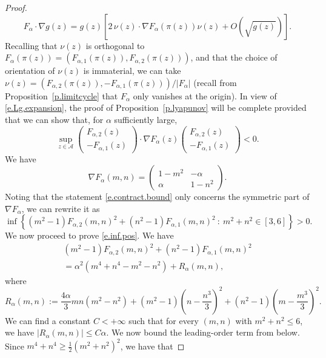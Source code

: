 \documentclass[11pt]{amsart}
\theoremstyle{remark}
\theoremstyle{definition}
\numberwithin{equation}{section}
\numberwithin{proposition}{section}
\renewcommand{\le}{\leqslant}
\renewcommand{\ge}{\geqslant}
\newcommand{\Ll}{\left}
\newcommand{\Rr}{\right}
\newcommand{\1}{\mathbf{1}}
\newcommand{\mcl}{\mathcal}
\newcommand{\al}{\alpha}
\begin{document}
\begin{proof}
\begin{equation}
\label{e.Lg.expansion}
F_\al \cdot \nabla g(z) = g(z)\Ll[2 \, \nu(z) \cdot \nabla F_\al(\pi(z))\nu(z) + O\Ll(\sqrt{g(z)}\Rr)\Rr].
\end{equation}
Recalling that $\nu(z)$ is orthogonal to $F_\al(\pi(z)) = (F_{\al,1}(\pi(z)), F_{\al,2}(\pi(z)))$, and that the choice of orientation of $\nu(z)$ is immaterial, we can take $\nu(z) = (F_{\al,2}(\pi(z)), -F_{\al,1}(\pi(z)))/|F_\al|$ (recall from Proposition~\ref{p.limitcycle} that $F_\al$ only vanishes at the origin). In view of \eqref{e.Lg.expansion}, the proof of Proposition~\ref{p.lyapunov} will be complete provided that we can show that, for $\al$ sufficiently large,
\begin{equation}
\label{e.contract.bound}
\sup_{z \in \mcl A}
\begin{pmatrix}  %
F_{\al,2}(z) \\
-F_{\al,1}(z)
\end{pmatrix}
\cdot \nabla F_\al(z)
\begin{pmatrix}  %
F_{\al,2}(z) \\
-F_{\al,1}(z)
\end{pmatrix} < 0.
\end{equation}
We have
\[
\nabla F_\al(m,n) = 
\begin{pmatrix} 
1 - m^2 & -\al \\ 
\al & 1 - n^2 
\end{pmatrix}.
\]
Noting that the statement \eqref{e.contract.bound} only concerns the symmetric part of $\nabla F_\al$, we can rewrite it as
\begin{equation}  
\label{e.inf.pos}
\inf \Ll\{ (m^2 - 1) F_{\al,2}(m,n)^2 + (n^2 - 1) F_{\al,1}(m,n)^2  \ : \ m^2 + n^2 \in [3,6]\Rr\}  > 0.
\end{equation}
We now proceed to prove \eqref{e.inf.pos}.
We have
\begin{multline}
\label{e.expand.alpha}
(m^2 - 1) F_{\al,2}(m,n)^2 + (n^2 - 1) F_{\al,1}(m,n)^2
\\
= \al^2 (m^4 + n^4 - m^2 - n^2) + R_\al(m,n),
\end{multline}
where
\begin{equation*}
R_\al(m,n) := \frac{4\al}{3} mn(m^2-n^2) + (m^2-1)\Ll(n - \frac{n^3}{3}\Rr)^2 + (n^2-1)\Ll(m - \frac{m^3}{3}\Rr)^2.
\end{equation*}
We can find a constant $C < +\infty$ such that for every $(m,n)$ with $m^2 + n^2 \le 6$, we have $|R_\al(m,n)| \le C\al$. 
We now bound the leading-order term from below. Since $m^4 + n^4 \ge \frac 1 2 (m^2 + n^2)^2$, we have that

\end{proof}
\end{document}
